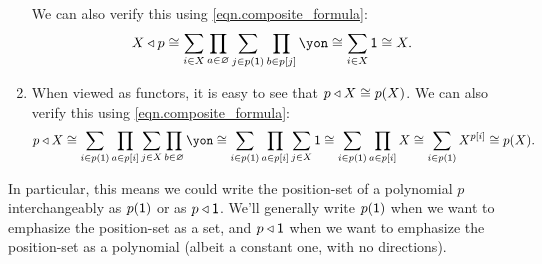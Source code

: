 \documentclass[Book-Poly]{subfiles}
\begin{document}
\begin{exercise}
\begin{solution}
\begin{enumerate}[resume]
    We can also verify this using \eqref{eqn.composite_formula}:
    \[
        X \tri p \iso \sum_{i \in X} \prod_{a \in \varnothing} \sum_{j \in p(\1)} \prod_{b \in p[j]} \yon \iso \sum_{i \in X} \1 \iso X.
    \]
    \item When viewed as functors, it is easy to see that $p \mathbin{\triangleleft} X \cong p(X)$.
    We can also verify this using \eqref{eqn.composite_formula}:
    \[
        p \tri X \iso \sum_{i \in p(\1)} \prod_{a \in p[i]} \sum_{j \in X} \prod_{b \in \varnothing} \yon \iso \sum_{i \in p(\1)} \prod_{a \in p[i]} \sum_{j \in X} \1 \iso \sum_{i \in p(\1)} \prod_{a \in p[i]} X \iso \sum_{i \in p(\1)} X^{p[i]} \iso p(X).
    \]
\end{enumerate}
\end{solution}
\end{exercise}

In particular, this means we could write the position-set of a polynomial $p$ interchangeably as $p(\textsf{1})$ or as $p\mathbin{\triangleleft}\textsf{1}$.
We'll generally write $p(\textsf{1})$ when we want to emphasize the position-set as a set, and $p\mathbin{\triangleleft}\textsf{1}$ when we want to emphasize the position-set as a polynomial (albeit a constant one, with no directions).
\end{document}
